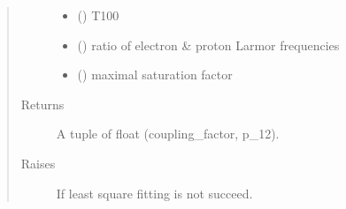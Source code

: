 \documentclass[letterpaper,10pt,english]{sphinxmanual}
\begin{document}
\begin{fulllineitems}
\begin{fulllineitems}
\begin{quote}
\begin{description}
\begin{itemize}
\item {} 
 () \sphinxhyphen{}\sphinxhyphen{} T100

\item {} 
 () \sphinxhyphen{}\sphinxhyphen{} ratio of electron \& proton Larmor frequencies

\item {} 
 () \sphinxhyphen{}\sphinxhyphen{} maximal saturation factor

\end{itemize}

\item[{Returns}] \leavevmode
A tuple of float (coupling\_factor, p\_12).

\item[{Raises}] \leavevmode
{\hyperref[\detokenize{dnpHydration:dnpLab.dnpHydration.FitError}]{}} \sphinxhyphen{}\sphinxhyphen{} If least square fitting is not succeed.

\end{description}\end{quote}

\end{fulllineitems}


\end{fulllineitems}

\end{document}
